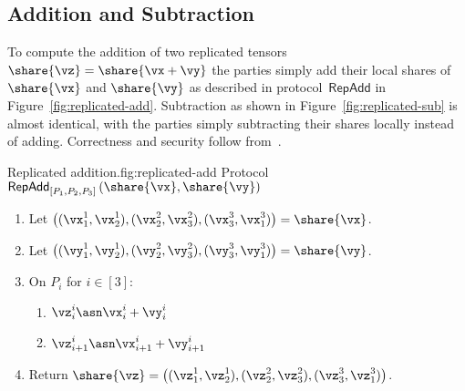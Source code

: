 \subsection{Addition and Subtraction}

To compute the addition of two replicated tensors $\share{\vz} = \share{\vx + \vy}$
the parties simply add their local shares of $\share{\vx}$ and $\share{\vy}$
as described in protocol~$\mathsf{RepAdd}$ in Figure~\ref{fig:replicated-add}. Subtraction as shown in Figure~\ref{fig:replicated-sub} is almost identical, with the parties simply subtracting their shares locally instead of adding. Correctness and security follow from~\cite{CCS:ABFLNO16}.

\begin{Boxfig}{Replicated addition.}{fig:replicated-add}
  {Protocol $\mathsf{RepAdd}_{[P_1, P_2, P_3]}\left(\share{\vx}, \share{\vy} \right)$}
  
  \begin{enumerate}
  \item Let $\left( (\vx_1^1, \vx_2^1), (\vx_2^2, \vx_3^2), (\vx_3^3, \vx_1^3) \right) = \share{\vx}$.
  
  \item Let $\left( (\vy_1^1, \vy_2^1), (\vy_2^2, \vy_3^2), (\vy_3^3, \vy_1^3) \right) = \share{\vy}$.
  
  \item On $P_i$ for $i \in [3]$:
  \begin{enumerate}
    \item $\vz_i^i \asn \vx_i^i + \vy_i^i$
    \item $\vz_{i+1}^i \asn \vx_{i+1}^i + \vy_{i+1}^i$
  \end{enumerate}
  
  \item Return $\share{\vz} = \left( (\vz_1^1, \vz_2^1), (\vz_2^2, \vz_3^2), (\vz_3^3, \vz_1^3) \right)$.
  \end{enumerate}
\end{Boxfig}


